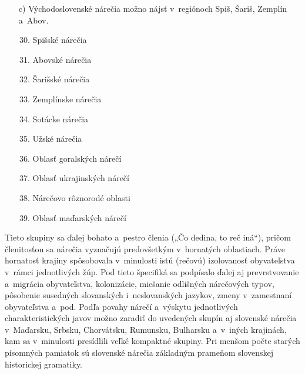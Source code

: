 \begin{itemize}
\item[c)] Východoslovenské nárečia možno nájsť v~regiónoch Spiš, Šariš, Zemplín a~Abov.

\begin{enumerate}
\setcounter{enumi}{29}
\item Spišské nárečia
\item Abovské nárečia
\item Šarišské nárečia
\item Zemplínske nárečia
\item Sotácke nárečia
\item Užské nárečia
\setcounter{enumi}{39}
\item Oblasť goralských nárečí
\item Oblasť ukrajinských nárečí
\item Nárečovo rôznorodé oblasti 
\item Oblasť maďarských nárečí
\end{enumerate}
\end{itemize}

\medskip

Tieto skupiny sa ďalej bohato a~pestro členia („Čo dedina, to reč iná“), pričom členitosťou sa nárečia vyznačujú predovšetkým v~hornatých oblastiach. Práve hornatosť krajiny spôsobovala v~minulosti istú (rečovú) izolovanosť obyvateľstva v~rámci jednotlivých žúp. Pod tieto špecifiká sa podpísalo ďalej aj prevrstvovanie a~migrácia obyvateľstva, kolonizácie, miešanie odlišných nárečových typov, pôsobenie susedných slovanských i~neslovanských jazykov, zmeny v~zamestnaní obyvateľstva a~pod. Podľa povahy nárečí a~výskytu jednotlivých charakteristických javov možno zaradiť do uvedených skupín aj slovenské nárečia v~Maďarsku, Srbsku, Chorvátsku, Rumunsku, Bulharsku a~v~iných krajinách, kam sa v~minulosti presídlili veľké kompaktné skupiny. Pri menšom počte starých písomných pamiatok sú slovenské nárečia základným prameňom slovenskej historickej gramatiky.

